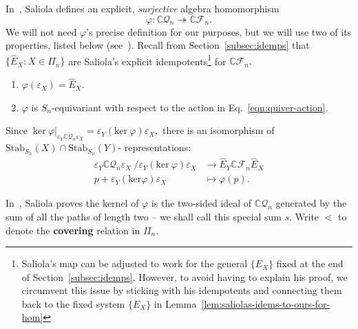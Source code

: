 \documentclass[ALCO, Unicode]{cedram}
\def \ker{\mathrm{ker}}
\def\C{{\mathbb{C}}}
\def\stab{\mathrm{Stab}}
\begin{document}
In~\cite[Theorem 6.2]{saliolaquiverdescalgebra}, Saliola defines an explicit, \textit{surjective} algebra homomorphism  \[\varphi: \C \mathcal{Q}_n \twoheadrightarrow \C \mathcal{F}_n.\]  We will not need $\varphi$'s precise definition for our purposes, but we will use two of its  properties, listed below (see~\cite[Theorem 6.2]{saliolaquiverdescalgebra}). Recall from Section~\ref{subsec:idemps} that \mbox{$\{\widehat{E}_X: X \in \Pi_n\}$} are Saliola's explicit {idempotents}\footnote{Saliola's map can be adjusted to work for the general $\{E_X\}$ fixed at the end of Section~\ref{subsec:idemps}. However, to avoid having to explain his proof, we circumvent this issue by sticking with his idempotents and connecting them back to the fixed system $\{E_X\}$ in Lemma~\ref{lem:saliolas-idems-to-ours-for-hom}} for $\C\mathcal{F}_n. $
\begin{enumerate}
    \item[(i)] $\varphi\left(\varepsilon_X \right) = \widehat{E}_X.$ 
    \item[(ii)] $\varphi$ is $S_n$-equivariant with respect to the action in Eq.~\eqref{eqn:quiver-action}.
\end{enumerate}

Since $ \ \ker \ \varphi \vert_{\varepsilon_Y \C \mathcal{Q}_n \varepsilon_X} = \varepsilon_Y \left( \ker \ \varphi  \right)\varepsilon_X,$  there is an isomorphism of  $\stab_{S_n}(X) \cap \stab_{S_n}(Y)$- representations:
\begin{align}\label{quiver-double-idem-spaces} 
\varepsilon_Y \C \mathcal{Q}_n \varepsilon_X\  / \varepsilon_Y \left( \ker \ \varphi  \right)\varepsilon_X &\longrightarrow \widehat{E}_Y \C \mathcal{F}_n \widehat{E}_X \\
p + \varepsilon_Y \left(\ker \varphi\right) \varepsilon_X &\mapsto \varphi(p).\nonumber 
\end{align}

 In~\cite[Theorem 6.2]{saliolaquiverdescalgebra}, Saliola proves the kernel of $\varphi$ is the two-sided ideal of $\C \mathcal{Q}_n$ generated by the sum of all the paths of length two -- we shall call this special sum $s$. Write \textbf{$\lessdot$} to denote the \textbf{covering} relation in $\Pi_n.$
\end{document}

